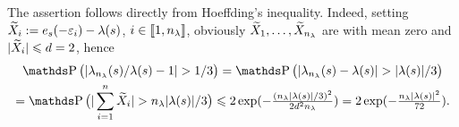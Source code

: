 \begin{pro}
The assertion follows directly from Hoeffding's inequality. Indeed, setting
$\tX_i:=\bas_s(-\rE_i)-\fedf[(s)]$, $i\in\nset{1,\ssE}$, obviously
$\tX_1,\dotsc,\tX_{\ssE}$ are \iid with mean zero and $|\tX_i|\leq d=2$, hence
\begin{multline*}
  \P\big(|\hfedf[(s)]/\fedf[(s)]-1|>1/3\big)=\P\big(|\hfedf[(s)]-\fedf[(s)]|>|\fedf[(s)]|/3\big)\\=\P\big(|\sum_{i=1}^n\tX_i|>\ssE|\fedf[(s)]|/3\big)\leq
  2\exp(-\tfrac{(\ssE|\fedf[(s)]|/3)^2}{2d^2\ssE})=2\exp(-\tfrac{\ssE|\fedf[(s)]|^2}{72}).
\end{multline*}
\proEnd
\end{pro}